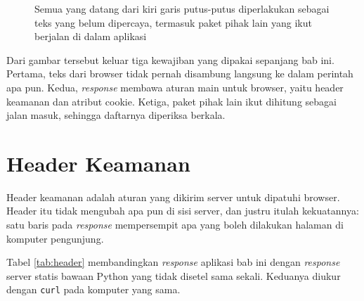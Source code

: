 \begin{figure}[!htb]
  \centering
  \caption{Semua yang datang dari kiri garis putus-putus diperlakukan sebagai
           teks yang belum dipercaya, termasuk paket pihak lain yang ikut
           berjalan di dalam aplikasi}
  \label{fig:batas-percaya}
\end{figure}

Dari gambar tersebut keluar tiga kewajiban yang dipakai sepanjang bab ini.
Pertama, teks dari browser tidak pernah disambung langsung ke dalam perintah
apa pun. Kedua, \textit{response} membawa aturan main untuk browser, yaitu
header keamanan dan atribut cookie. Ketiga, paket pihak lain ikut dihitung
sebagai jalan masuk, sehingga daftarnya diperiksa berkala.

\section{Header Keamanan}

Header keamanan adalah aturan yang dikirim server untuk dipatuhi browser.
Header itu tidak mengubah apa pun di sisi server, dan justru itulah
kekuatannya: satu baris pada \textit{response} mempersempit apa yang boleh
dilakukan halaman di komputer pengunjung.

Tabel \ref{tab:header} membandingkan \textit{response} aplikasi bab ini
dengan \textit{response} server statis bawaan Python yang tidak disetel sama
sekali. Keduanya diukur dengan \texttt{curl} pada komputer yang sama.

